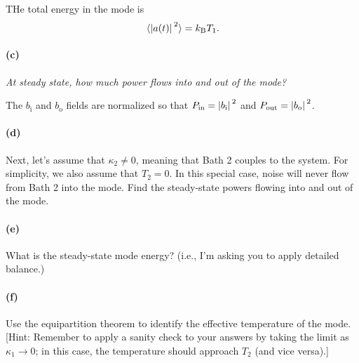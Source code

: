 \documentclass[hyperref, a4paper]{article}
\newcommand*{\kB}{k_{\text{B}}}
\newcommand*{\bi}{b_{\text{i}}}
\newcommand*{\bo}{b_{\text{o}}}
\begin{document}
THe total energy in the mode is 
\begin{equation}
    \expval*{\abs*{a(t)}^2} = \kB T_1.
\end{equation}

\paragraph*{(c)} \textit{At steady state, how much power flows into and out of the mode?} 

The $\bi$ and $\bo$ fields are normalized so that $P_{\text{in}} = \abs*{\bi}^2$ and $P_{\text{out}} = \abs*{\bo}^2$.


\paragraph*{(d)} Next, let's assume that $\kappa_2 \neq 0$, meaning that Bath 2 couples to the system. For simplicity, we also assume that $T_2=0$. In this special case, noise will never flow from Bath 2 into the mode. Find the steady-state powers flowing into and out of the mode.

\paragraph*{(e)} What is the steady-state mode energy? (i.e., I'm asking you to apply detailed balance.)

\paragraph*{(f)} Use the equipartition theorem to identify the effective temperature of the mode. [Hint: Remember to apply a sanity check to your answers by taking the limit as $\kappa_1 \rightarrow 0$; in this case, the temperature should approach $T_2$ (and vice versa).]
\end{document}
